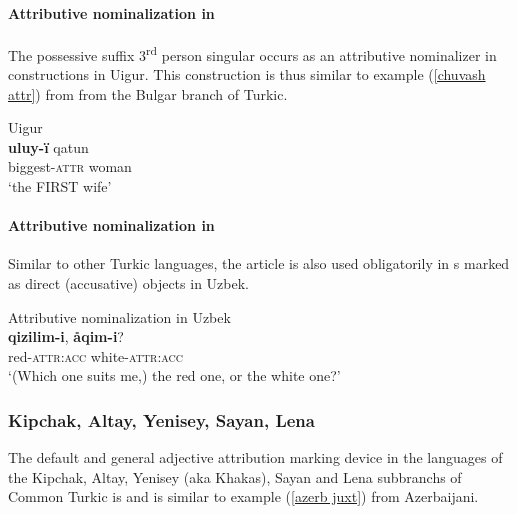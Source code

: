 \paragraph*{Attributive nominalization in } 
The possessive suffix 3\textsuperscript{rd} person singular occurs as an attributive nominalizer in  constructions in Uigur. This construction is thus similar to example (\ref{chuvash attr}) from  from the Bulgar branch of Turkic.
\begin{exe}
\ex 
\rm{Uigur \citep[17–18, Footnote 58]{benzing1993b}}\\
\gll	\textbf{uluy-ï} qatun\\
	biggest-\textsc{attr} woman\\
\glt	‘the FIRST wife’
\end{exe}

\paragraph*{Attributive nominalization in }
Similar to other Turkic languages, the article is also used obligatorily in s marked as direct (accusative) objects in Uzbek. 
\begin{exe}
\ex 
\label{uzbek headless acc}	
\rm{Attributive nominalization in Uzbek \citep[371]{boeschoten1998}}\\
 \textbf{qizilim-i}, \textbf{åqim-i}?\\
 	{ } red-\textsc{attr:acc} white-\textsc{attr:acc}\\
\glt 	‘(Which one suits me,) the red one, or the white one?’
\end{exe}

\subsubsection{Kipchak, Altay, Yenisey, Sayan, Lena}
The default and general adjective attribution marking device in the languages of the Kipchak, Altay, Yenisey (aka Khakas), Sayan and Lena subbranchs of Common Turkic is \textbf{} and is similar to example (\ref{azerb juxt}) from Azerbaijani.

